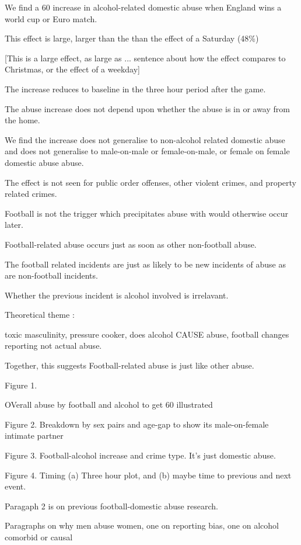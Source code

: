 \documentclass[12pt, letterpaper]{article}
\begin{document}
We find a 60 increase in alcohol-related domestic abuse when England wins a world cup or Euro match. 

This effect is large, larger than the  than the effect of a Saturday (48\%)

[This is a large effect, as large as ... sentence about how the effect compares to Christmas, or the effect of a weekday]

The increase reduces to baseline in the three hour period after the game.

The abuse increase does not depend upon whether the abuse is in or away from the home.

We find the increase does not generalise to non-alcohol related domestic abuse and does not generalise to male-on-male or female-on-male, or female on female domestic abuse abuse. 

The effect is not seen for public order offenses, other violent crimes, and property related crimes.  

Football is not the trigger which precipitates abuse with would otherwise occur later. 

Football-related abuse occurs just as soon as other non-football abuse. 

The football related incidents are just as likely to be new incidents of abuse as are non-football incidents. 


Whether the previous incident is alcohol involved is irrelavant.

Theoretical theme :

toxic masculinity, pressure cooker, does alcohol CAUSE abuse, football changes reporting not actual abuse.

Together, this suggests Football-related abuse is just like other abuse. 


Figure 1.

OVerall abuse by football and alcohol to get 60 illustrated

Figure 2. Breakdown by sex pairs and age-gap to show its male-on-female intimate partner

Figure 3. Football-alcohol increase and crime type. It's just domestic abuse.

Figure 4. Timing (a) Three hour plot, and (b) maybe time to previous and next event.

Paragaph 2 is on previous football-domestic abuse research.

Paragraphs on why men abuse women, one on reporting bias, one on alcohol comorbid or causal
\end{document}
